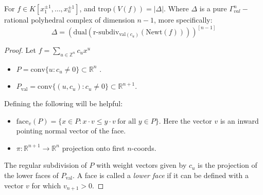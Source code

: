     \begin{theorem}
        \label{trpisNewtTh}
        For $f \in K[x_1^{\pm 1}, \dots, x_n^{\pm 1}]$, and $\text{trop}(V(f)) = |\Delta|$. Where $\Delta$ is a pure $\Gamma_{val}^n-$rational polyhedral complex of dimension $n-1$, more specifically:
        \begin{equation*}
            \Delta = \left(\text{dual}\left(\text{r-subdiv}_{\text{val}(c_u)}\left(\text{Newt}(f)\right)\right)\right)^{[n-1]}
        \end{equation*}
    \end{theorem}
    \begin{proof} 
       Let $f = \sum_{u \in \mathbb{Z}^n}c_ux^u$
       \begin{itemize}
           \item $P = \text{conv}\{u: c_u \neq 0\} \subset \mathbb{R}^n$ .
           \item $P_{\text{val}} = \text{conv}\{(u,c_u): c_u \neq 0\}\subset \mathbb{R}^{n+1}$.
       \end{itemize}
       Defining the following will be helpful:
       \begin{itemize}
           \item $\text{face}_v(P) = \{x \in P : x\cdot v \leq y \cdot v~ \text{for all } y \in P\}$. Here the vector $v$ is an inward pointing normal vector of the face.
           \item $\pi: \mathbb{R}^{n+1} \to \mathbb{R}^n$ projection onto first $n$-coords.
       \end{itemize}
       The regular subdivision of $P$ with weight vectors given by $c_u$ is the projection of the lower faces of $P_{\text{val}}$.
       A face is called a \textit{lower face} if it can be defined with a vector $v$ for which $v_{n+1} > 0$.
       

\end{proof}
